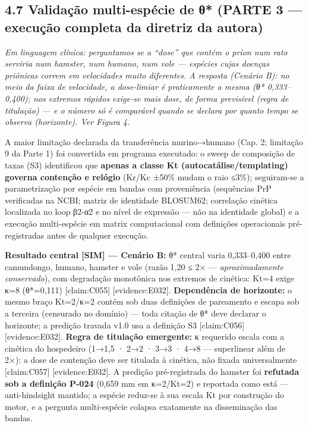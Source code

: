 \documentclass[
  12pt,
]{report}
\begin{document}
\hypertarget{validauxe7uxe3o-multi-espuxe9cie-de-ux3b8-parte-3-execuuxe7uxe3o-completa-da-diretriz-da-autora}{%
\subsection{4.7 Validação multi-espécie de θ* (PARTE 3 --- execução
completa da diretriz da
autora)}\label{validauxe7uxe3o-multi-espuxe9cie-de-ux3b8-parte-3-execuuxe7uxe3o-completa-da-diretriz-da-autora}}

\emph{Em linguagem clínica: perguntamos se a ``dose'' que contém o príon
num rato serviria num hamster, num humano, num vole --- espécies cujas
doenças priônicas correm em velocidades muito diferentes. A resposta
(Cenário B): no meio da faixa de velocidade, a dose-limiar é
praticamente a mesma (θ* 0,333--0,400); nos extremos rápidos exige-se
mais dose, de forma previsível (regra de titulação) --- e o número só é
comparável quando se declara por quanto tempo se observa (horizonte).
Ver Figura 4.}

A maior limitação declarada da transferência murino→humano (Cap. 2;
limitação 9 da Parte 1) foi convertida em programa executado: o sweep de
composição de taxas (S3) identificou que \textbf{apenas a classe Kt
(autocatálise/templating) governa contenção e relógio} (Kr/Kc ±50\%
mudam o raio ≤3\%); seguiram-se a parametrização por espécie em bandas
com proveniência (sequências PrP verificadas na NCBI; matriz de
identidade BLOSUM62; correlação cinética localizada no loop β2-α2 e no
nível de expressão --- não na identidade global) e a execução
multi-espécie em matrix computacional com definições operacionais
pré-registradas antes de qualquer execução.

\textbf{Resultado central {[}SIM{]} --- Cenário B:} θ* central varia
0,333--0,400 entre camundongo, humano, hamster e vole (razão 1,20 ≤ 2×
--- \emph{aproximadamente conservado}), com degradação monotônica nos
extremos de cinética: Kt=4 exige κ=8 (θ*=0,111) {[}claim:C055{]}
{[}evidence:E032{]}. \textbf{Dependência de horizonte:} o mesmo braço
Kt=2/κ=2 contém sob duas definições de pareamento e escapa sob a
terceira (censurado no domínio) --- toda citação de θ* deve declarar o
horizonte; a predição travada v1.0 usa a definição S3 {[}claim:C056{]}
{[}evidence:E032{]}. \textbf{Regra de titulação emergente:} κ requerido
escala com a cinética do hospedeiro (1→1,5 · 2→2 · 3→3 · 4→8 ---
superlinear além de 2×): a dose de contenção deve ser titulada à
cinética, não fixada universalmente {[}claim:C057{]}
{[}evidence:E032{]}. A predição pré-registrada do hamster foi
\textbf{refutada sob a definição P-024} (0,659 mm em κ=2/Kt=2) e
reportada como está --- anti-hindsight mantido; a espécie reduz-se à sua
escala Kt por construção do motor, e a pergunta multi-espécie colapsa
exatamente na disseminação das bandas.
\end{document}
